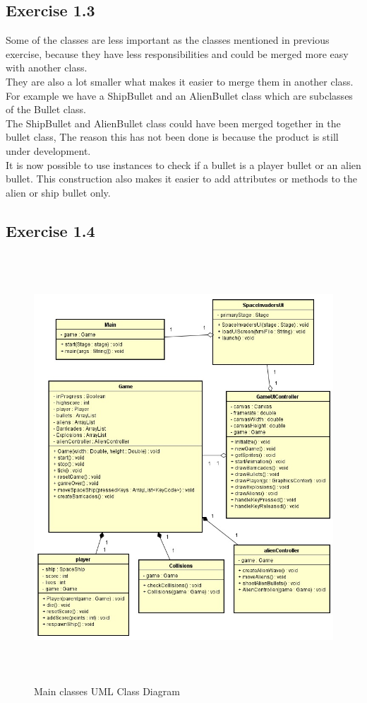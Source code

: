 \documentclass[10pt]{article}
\begin{document}
\subsection*{Exercise 1.3} 
Some of the classes are less important as the classes mentioned in previous exercise, because they have less responsibilities and could be merged more easy with another class.\\
They are also a lot smaller what makes it easier to merge them in another class. For example we have a ShipBullet and an AlienBullet class which are subclasses of the Bullet class. \\
The ShipBullet and AlienBullet class could have been merged together in the bullet class, The reason this has not been done is because the product is still under development. \\
It is now possible to use instances to check if a bullet is a player bullet or an alien bullet. This construction also makes it easier to add attributes or methods to the alien or ship bullet only.\\
 \pagebreak

\subsection*{Exercise 1.4} 
\begin{figure}[ht!]
\centering
\includegraphics[width=14cm, height=16cm]{UMLSEM.jpg}
\caption{Main classes UML Class Diagram}
\end{figure}
\pagebreak
\end{document}
